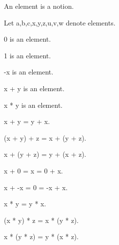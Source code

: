 \documentclass[a4paper,draft]{amsproc}
\begin{document}
\begin{forthel}

\begin{signature}[ElmSort]
An element is a notion.
\end{signature}

Let a,b,c,x,y,z,u,v,w denote elements.

\begin{signature}[SortsC]
0 is an element.
\end{signature}

\begin{signature}[SortsC]
1 is an element.
\end{signature}

\begin{signature}[Sortsu]
-x is an element.
\end{signature}

\begin{signature}[SortsB]
x + y is an element.
\end{signature}

\begin{signature}[SortsB]
x * y is an element.
\end{signature}

\begin{axiom}[AddComm]
x + y = y + x.
\end{axiom}

\begin{axiom}[AddAsso]
(x + y) + z = x + (y + z).
\end{axiom}

\begin{axiom}[AddBubble]
x + (y + z) = y + (x + z).
\end{axiom}

\begin{axiom}[AddZero]
x + 0 = x = 0 + x.
\end{axiom}

\begin{axiom}[AddInvr]
x + -x = 0 = -x + x.
\end{axiom}

\begin{axiom}[MulComm]
x * y = y * x.
\end{axiom}

\begin{axiom}[MulAsso]
(x * y) * z = x * (y * z).
\end{axiom}

\begin{axiom}[MulBubble]
x * (y * z) = y * (x * z).
\end{axiom}


\end{forthel}
\end{document}
